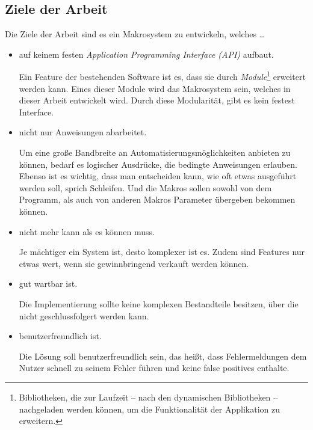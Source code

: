   \subsection{Ziele der Arbeit}
  \label{ssec:Ziele der Arbeit}
    Die Ziele der Arbeit sind es ein Makrosystem zu entwickeln, welches \ldots
    \begin{itemize}
      \item auf keinem festen \emph{Application Programming Interface (API)} aufbaut.

        Ein Feature der bestehenden Software ist es, dass sie durch \emph{Module}\footnote{
          Bibliotheken, die zur Laufzeit -- nach den dynamischen Bibliotheken --  nachgeladen werden können, um die Funktionalität der Applikation zu erweitern.
        } erweitert werden kann. Eines dieser Module wird das Makrosystem sein, welches in dieser Arbeit entwickelt wird. Durch diese Modularität, gibt es kein festest Interface.

      \item nicht nur Anweisungen abarbeitet.

        Um eine große Bandbreite an Automatisierungsmöglichkeiten anbieten zu können, bedarf es logischer Ausdrücke, die bedingte Anweisungen erlauben. Ebenso ist es wichtig, dass man entscheiden kann, wie oft etwas ausgeführt werden soll, sprich Schleifen. Und die Makros sollen sowohl von dem Programm, als auch von anderen Makros Parameter übergeben bekommen können.

      \item nicht mehr kann als es können muss.

        Je mächtiger ein System ist, desto komplexer ist es. Zudem sind Features nur etwas wert, wenn sie gewinnbringend verkauft werden können.

      \item gut wartbar ist.

        Die Implementierung sollte keine komplexen Bestandteile besitzen, über die nicht geschlussfolgert werden kann.

      \item benutzerfreundlich ist.

        Die Lösung soll benutzerfreundlich sein, das heißt, dass Fehlermeldungen dem Nutzer schnell zu seinem Fehler führen und keine false positives enthalte.
    \end{itemize}

